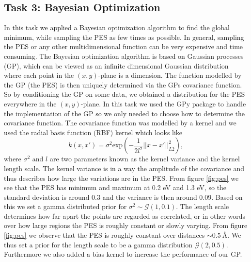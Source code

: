 \documentclass[11pt,a4paper]{article}
\begin{document}
\subsection[Task 1]{Task 3: Bayesian Optimization}
\label{sec:method_task3}
In this task we applied a Bayesian optimization algorithm to find the global minimum, while sampling the PES as few times as possible. In general, sampling the PES or any other multidimensional function can be very expensive and time consuming. The Bayesian optimization algorithm is based on Gaussian processes (GP), which can be viewed as an infinite dimensional Gaussian distribution where each point in the $(x,y)$-plane is a dimension. The function modelled by the GP (the PES) is then uniquely determined via the GPs covariance function. So by conditioning the GP on some data, we obtained a distribution for the PES everywhere in the $(x,y)$-plane. In this task we used the GPy package to handle the implementation of the GP so we only needed to choose how to determine the covariance function. The covariance function was modelled by a kernel and we used the radial basis function (RBF) kernel which looks like 
\begin{equation*}
    k(x, x') = \sigma^2 \text{exp}(-\frac{1}{2l^2}||x - x'||_{L2}^2),
\end{equation*}
where $\sigma^2$ and $l$ are two parameters known as the kernel variance and the kernel length scale. The kernel variance is in a way the amplitude of the covariance and thus describes how large the variations are in the PES. From figure \ref{fig:pes} we see that the PES has minimum and maximum at 0.2 eV and 1.3 eV, so the standard deviation is around 0.3 and the variance is then around 0.09. Based on this we set a gamma distributed prior for $\sigma^2 \sim \mathcal{G}(1,0.1)$. The length scale determines how far apart the points are regarded as correlated, or in other words over how large regions the PES is roughly constant or slowly varying. From figure \ref{fig:pes} we observe that the PES is roughly constant over distances $\sim \SI{0.5}{Å}$. We thus set a prior for the length scale to be a gamma distribution $\mathcal{G}(2,0.5)$. Furthermore we also added a bias kernel to increase the performance of our GP.
\end{document}
